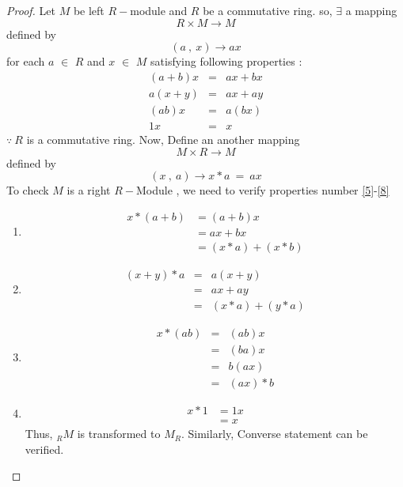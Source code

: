 \begin{proof} Let $M$ be left $R-$module and $R$ be a commutative ring. \newline
	so, $\exists$ a mapping
\begin{equation*}
R \times M \rightarrow M
\end{equation*}	
defined by 
\begin{equation*}
(a \ , \ x) \rightarrow ax  
\end{equation*}
for each $a$ $\in$ $R$ and $x$ $\in$ $M$ satisfying following properties :
\begin{eqnarray*}
(a+b) x &=& ax + bx \\ a(x+y) &=& ax + ay \\ (ab)x &=& a(bx) \\ 1x &=& x
\end{eqnarray*}
$\because \ R$ is a commutative ring.\newline
Now, Define an another mapping
 \begin{equation*}
 M \times R \rightarrow M
 \end{equation*}	
 defined by 
 \begin{equation*}
 (x \ ,\ a) \rightarrow x*a \ = \ ax  
 \end{equation*}
To check $M$ is a right $R-$Module , we need to verify properties number \eqref{5}-\eqref{8}
 \begin{enumerate}
 	\item 
 	\begin{align*}
 		x*(a+b) &= (a+b)x \\ &= ax + bx \\ &= (x*a) + (x*b)
 	\end{align*}
 	\item \begin{eqnarray*}
 		(x+y)*a &=& a(x+y) \\ &=& ax + ay \\ &=& (x*a) + (y*a)
 	      \end{eqnarray*}
       \item \begin{eqnarray*}
       x*(ab) &=& (ab)x \\ &=& (ba)x \\ &=& b(ax) \\ &=& (ax)*b
       \end{eqnarray*} 
   \item \begin{eqnarray*}
   x*1 &= 1x \\  &= x
   \end{eqnarray*}
Thus, $_{R}M$ is transformed to $M_R$.\newline
Similarly, Converse statement can be verified.
\end{enumerate}
\end{proof} \bigskip
